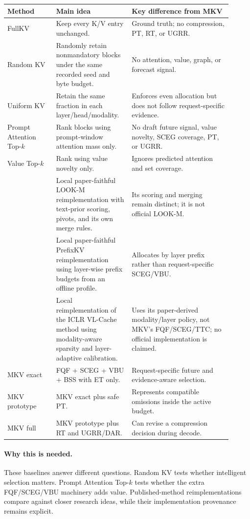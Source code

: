 \documentclass[11pt]{article}
\newcommand{\code}[1]{\texttt{\detokenize{#1}}}
\newcommand{\why}{\paragraph{Why this is needed.}}
\begin{document}
\begin{longtable}{>{\raggedright\arraybackslash}p{0.20\linewidth}p{0.30\linewidth}p{0.41\linewidth}}
\toprule
Method & Main idea & Key difference from MKV \\
\midrule
\endhead
FullKV & Keep every K/V entry unchanged. & Ground truth; no compression, PT, RT, or UGRR. \\
Random KV & Randomly retain nonmandatory blocks under the same recorded seed and byte budget. & No
attention, value, graph, or forecast signal. \\
Uniform KV & Retain the same fraction in each layer/head/modality. & Enforces even allocation but
does not follow request-specific evidence. \\
Prompt Attention Top-$k$ & Rank blocks using prompt-window attention mass only. & No draft future
signal, value novelty, SCEG coverage, PT, or UGRR. \\
Value Top-$k$ & Rank using value novelty only. & Ignores predicted attention and set coverage. \\
\code{lookm_reimpl} & Local paper-faithful LOOK-M reimplementation with text-prior scoring, pivots,
and its own merge rules. & Its scoring and merging remain distinct; it is not official LOOK-M. \\
\code{prefixkv_reimpl} & Local paper-faithful PrefixKV reimplementation using layer-wise prefix
budgets from an offline profile. & Allocates by layer prefix rather than request-specific SCEG/VBU. \\
\code{vl_cache_reimpl} & Local reimplementation of the ICLR VL-Cache method using modality-aware
sparsity and layer-adaptive calibration. & Uses its paper-derived modality/layer policy, not MKV's
FQF/SCEG/TTC; no official implementation is claimed. \\
MKV exact & FQF + SCEG + VBU + BSS with ET only. & Request-specific future and evidence-aware
selection. \\
MKV prototype & MKV exact plus safe PT. & Represents compatible omissions inside the active
budget. \\
MKV full & MKV prototype plus RT and UGRR/DAR. & Can revise a compression decision during decode. \\
\bottomrule
\end{longtable}

\why These baselines answer different questions. Random KV tests whether intelligent selection
matters. Prompt Attention Top-$k$ tests whether the extra FQF/SCEG/VBU machinery adds value.
Published-method reimplementations compare against closer research ideas, while their
implementation provenance remains explicit.
\end{document}
